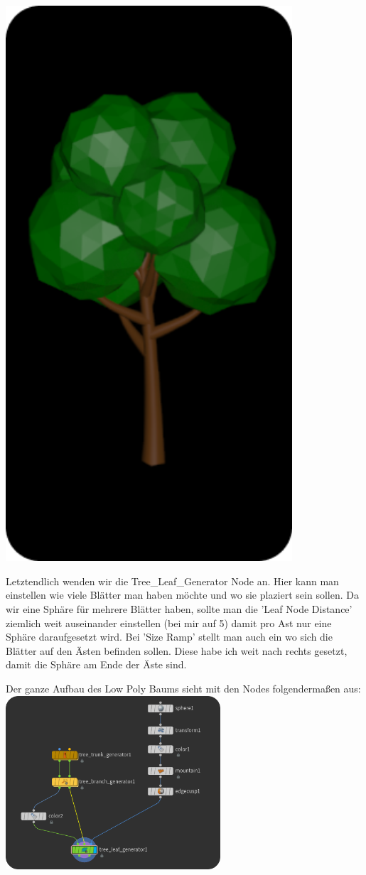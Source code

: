 \documentclass[paper=a4,fontsize=12pt,ngerman]{scrartcl}
\begin{document}
	\begin{minipage}{0.3\textwidth}
		\includegraphics[width=0.8\textwidth]{graphics/Ali10.png}
	\end{minipage}
	\begin{minipage}{0.7\textwidth}
		Letztendlich wenden wir die Tree\_Leaf\_Generator Node an. Hier kann man einstellen wie viele Blätter man haben möchte und wo sie plaziert sein sollen. Da wir eine Sphäre für mehrere Blätter haben, sollte man die 'Leaf Node Distance' ziemlich weit auseinander einstellen (bei mir auf 5) damit pro Ast nur eine Sphäre daraufgesetzt wird. Bei 'Size Ramp' stellt man auch ein wo sich die Blätter auf den Ästen befinden sollen. Diese habe ich weit nach rechts gesetzt, damit die Sphäre am Ende der Äste sind.
	\end{minipage}
	Der ganze Aufbau des Low Poly Baums sieht mit den Nodes folgendermaßen aus:\\
	\includegraphics*[width=0.6\textwidth]{graphics/Ali11.png}
\end{document}
